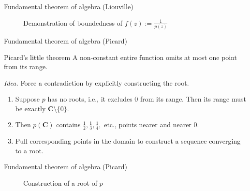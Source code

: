 \documentclass{beamer}
\begin{document}
\begin{frame}[b]{Fundamental theorem of algebra (Liouville)}
\begin{figure}
  
  \caption{Demonstration of boundedness of \(f(z) := \frac{1}{p(z)}\)}
  \label{fig:boundedness}
\end{figure}
\end{frame}

\begin{frame}[t]{Fundamental theorem of algebra (Picard)} \vspace{4pt}
\begin{block}{Picard's little theorem}
A non-constant entire function omits at most one point from its range.
\end{block}
\textit{Idea.} Force a contradiction by explicitly constructing the root.
\begin{enumerate}
	\item Suppose \(p\) has no roots, i.e., it excludes \(0\) from its range. Then its range must be exactly \(\mathbf{C} \setminus \{0\}\).
	\item Then \(p(\mathbf{C})\) contains \(\frac{1}{2}, \frac{1}{3}, \frac{1}{4},\) etc., points nearer and nearer \(0\).
	\item Pull corresponding points in the domain to construct a sequence converging to a root.
\end{enumerate}
\end{frame}

\begin{frame}[t]{Fundamental theorem of algebra (Picard)}
\begin{figure}
  	
  	\caption{Construction of a root of \(p\)}
  	\label{fig:consruction}
\end{figure}
\end{frame}
\end{document}
